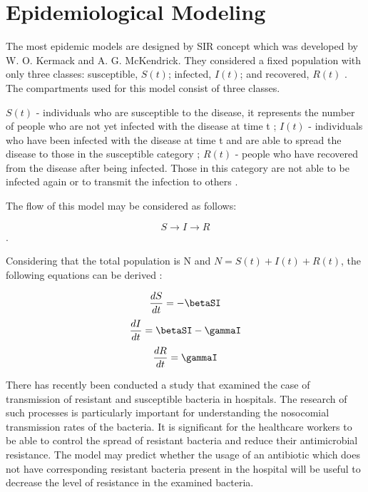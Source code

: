 \chapter*{Epidemiological Modeling}


The most epidemic models are designed by SIR concept which was developed by W. O. Kermack and A. G. McKendrick. They considered a fixed population with only three classes: susceptible, $S(t)$; infected, $I(t)$; and recovered, $R(t)$ \cite{per14}. The compartments used for this model consist of three classes.

$S(t)$ - individuals who are susceptible to the disease, it represents the number of people who are not yet infected with the disease at time t \cite{per14};
$I(t)$ - individuals who have been infected with the disease at time t and are able to spread the disease to those in the susceptible category \cite{per14};
$R(t)$ - people who have recovered from the disease after being infected. Those in this category are not able to be infected again or to transmit the infection to others \cite{per14}.

The flow of this model may be considered as follows:

$$S \rightarrow I \rightarrow R$$.

Considering that the total population is N and $N = S(t) + I(t) + R(t)$, the following equations can be derived \cite{per15}:

$$\frac{dS}{dt} = -\betaSI$$
$$\frac{dI}{dt} = \betaSI - \gammaI$$
$$\frac{dR}{dt} = \gammaI$$

There has recently been conducted a study that examined the case of transmission of resistant and susceptible bacteria in hospitals. The research of such processes is particularly important for understanding the nosocomial transmission rates of the bacteria. It is significant for the healthcare workers to be able to control the spread of resistant bacteria and reduce their antimicrobial resistance. The model may predict whether the usage of an antibiotic which does not have corresponding resistant bacteria present in the hospital will be useful to decrease the level of resistance in the examined bacteria.
